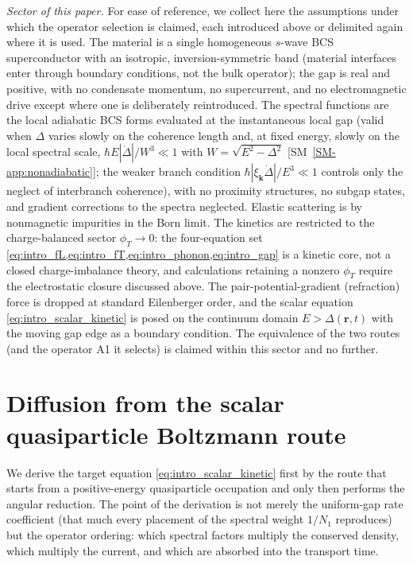 \documentclass[
  aps,
  prb,
  preprint,
  superscriptaddress,
  longbibliography,
  nofootinbib
]{revtex4-2}
\newcommand{\br}{\mathbf{r}}
\newcommand{\bk}{\mathbf{k}}
\newcommand{\DOS}{N_1}
\begin{document}
\emph{Sector of this paper.} For ease of reference, we collect here
the assumptions under which the operator selection is claimed, each
introduced above or delimited again where it is used. The material is a
single homogeneous \(s\)-wave BCS superconductor with an isotropic,
inversion-symmetric band (material interfaces enter through boundary
conditions, not the bulk operator); the gap is real and positive, with
no condensate momentum, no supercurrent, and no electromagnetic drive
except where one is deliberately reintroduced. The spectral functions
are the local adiabatic BCS forms evaluated at the instantaneous local
gap (valid when \(\Delta\) varies slowly on the coherence length and, at
fixed energy, slowly on the local spectral scale,
\(\hbar E|\dot\Delta|/W^{3}\ll1\) with \(W=\sqrt{E^2-\Delta^2}\)
[SM~\cref{SM-app:nonadiabatic}]; the weaker branch condition
\(\hbar|\xi_{\bk}\dot\Delta|/E^{3}\ll1\) controls only the neglect of
interbranch coherence), with
no proximity structures, no subgap states, and gradient corrections to
the spectra neglected. Elastic scattering is by nonmagnetic impurities
in the Born limit. The kinetics are restricted to the charge-balanced
sector \(\phi_T\to0\): the four-equation set
\cref{eq:intro_fL,eq:intro_fT,eq:intro_phonon,eq:intro_gap} is a kinetic
core, not a closed charge-imbalance theory, and calculations retaining a
nonzero \(\phi_T\) require the electrostatic closure discussed above. The
pair-potential-gradient (refraction) force is dropped at standard
Eilenberger order, and the scalar equation
\cref{eq:intro_scalar_kinetic} is posed on the continuum domain
\(E>\Delta(\br,t)\) with the moving gap edge as a boundary condition.
The equivalence of the two routes (and the operator A1 it
selects) is claimed within this sector and no further.

\section{Diffusion from the scalar quasiparticle Boltzmann route}
\label{sec:scalar_diffusion}

We derive the target equation \cref{eq:intro_scalar_kinetic} first by
the route that starts from a positive-energy quasiparticle occupation
and only then performs the angular reduction. The point of the
derivation is not merely the uniform-gap rate coefficient (that much
every placement of the spectral weight \(1/\DOS\) reproduces) but the
operator ordering: which spectral
factors multiply the conserved density, which multiply the current, and
which are absorbed into the transport time.
\end{document}

